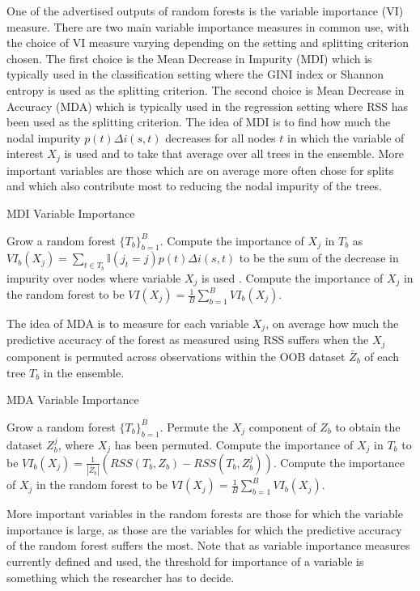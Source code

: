\documentclass[12pt,twoside]{reedthesis}
\theoremstyle{definition}
\theoremstyle{definition}
\theoremstyle{definition}
\theoremstyle{remark}
\begin{document}
One of the advertised outputs of random forests is the variable
importance (VI) measure. There are two main variable importance measures
in common use, with the choice of VI measure varying depending on the
setting and splitting criterion chosen. The first choice is the Mean
Decrease in Impurity (MDI) which is typically used in the classification
setting where the GINI index or Shannon entropy is used as the splitting
criterion. The second choice is Mean Decrease in Accuracy (MDA) which is
typically used in the regression setting where RSS has been used as the
splitting criterion. The idea of MDI is to find how much the nodal
impurity \(p(t)\Delta i(s,t)\) decreases for all nodes \(t\) in which
the variable of interest \(X_j\) is used and to take that average over
all trees in the ensemble. More important variables are those which are
on average more often chose for splits and which also contribute most to
reducing the nodal impurity of the trees.
\begin{algorithm}
        \caption{MDI Variable Importance}\label{mdi variable importance}
        \begin{algorithmic}[1]
            \State Grow a random forest $\{T_b\}_{b=1}^B$.
                \State Compute the importance of $X_j$ in $T_b$ as $VI_b(X_j)=\sum_{t\in T_b} \mathbb{I}(j_t=j)p(t)\Delta i(s,t)$ to be the sum of the decrease in impurity over nodes where variable $X_j$ is used .
                \EndFor
                \State Compute the importance of $X_j$ in the random forest to be $VI(X_j)=\frac{1}{B}\sum_{b=1}^B VI_b(X_j).$
            \EndFor
        \end{algorithmic}
    \end{algorithm}
The idea of MDA is to measure for each variable \(X_j\), on average how
much the predictive accuracy of the forest as measured using RSS suffers
when the \(X_j\) component is permuted across observations within the
OOB dataset \(\bar{Z}_b\) of each tree \(T_b\) in the ensemble.
\begin{algorithm}
        \caption{MDA Variable Importance}\label{mda variable importance}
        \begin{algorithmic}[1]
            \State Grow a random forest $\{T_b\}_{b=1}^B$.
            \State Permute the $X_j$ component of $Z_b$ to obtain the dataset $Z_b^j$, where $X_j$ has been permuted.
            \State Compute the importance of $X_j$ in $T_b$ to be $VI_b(X_j)=\frac{1}{|\bar{Z}_b|}(RSS(T_b,Z_b)-RSS(T_b,Z_b^j)).$
            \EndFor
            \State Compute the importance of $X_j$ in the random forest to be $VI(X_j)=\frac{1}{B}\sum_{b=1}^B VI_b(X_j).$
            \EndFor
        \end{algorithmic}
    \end{algorithm}
More important variables in the random forests are those for which the
variable importance is large, as those are the variables for which the
predictive accuracy of the random forest suffers the most. Note that as
variable importance measures currently defined and used, the threshold
for importance of a variable is something which the researcher has to
decide.
\end{document}
